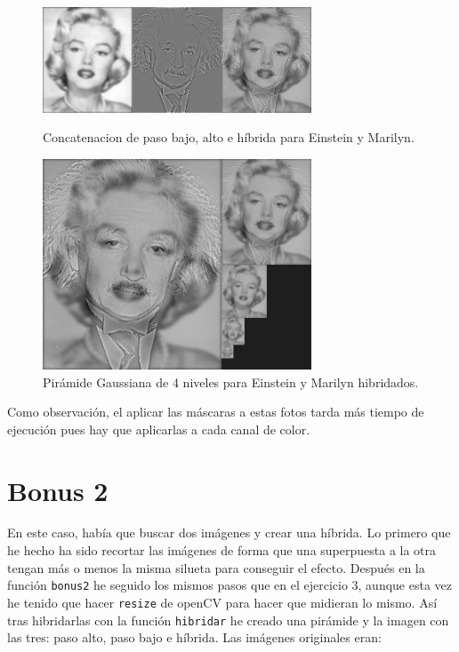 \documentclass[12pt]{article}
\begin{document}
\begin{figure}[H]
\centering
\parbox{8cm}{
\includegraphics[width=8cm]{images/ImagenEMCol.png}
\caption{Concatenacion de paso bajo, alto e híbrida para Einstein y Marilyn.}
\label{fig:2figsA}}
\begin{minipage}{8cm}
\includegraphics[width=8cm]{images/PirEMCol.png}
\caption{Pirámide Gaussiana de 4 niveles para Einstein y Marilyn hibridados.}
\label{fig:2figsB}
\end{minipage}
\end{figure}

Como observación, el aplicar las máscaras a estas fotos tarda más tiempo de ejecución pues hay que aplicarlas a cada canal de color.

\section*{Bonus 2}

En este caso, había que buscar dos imágenes y crear una híbrida. Lo primero que he hecho ha sido recortar las imágenes de forma que una superpuesta a la otra tengan más o menos la misma silueta para conseguir el efecto.
Después en la función \texttt{bonus2} he seguido los mismos pasos que en el ejercicio 3, aunque esta vez he tenido que hacer \texttt{resize} de openCV para hacer que midieran lo mismo. Así tras hibridarlas con la función \texttt{hibridar} he creado una pirámide y la imagen con las tres: paso alto, paso bajo e híbrida. Las imágenes originales eran:
\end{document}
